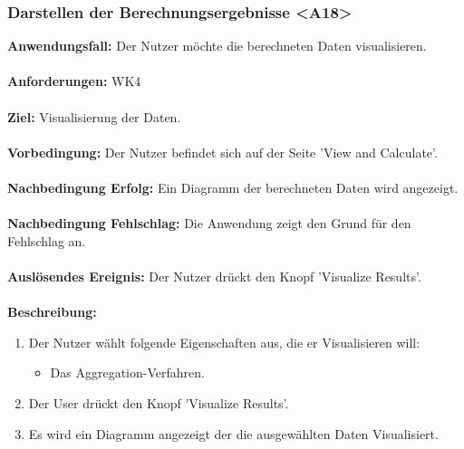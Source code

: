 \documentclass[parskip=full]{scrartcl} %
\begin{document}
\subsubsection*{Darstellen der Berechnungsergebnisse <A18>}
\textbf{Anwendungsfall:} Der Nutzer möchte die berechneten Daten visualisieren.\\\\
\textbf{Anforderungen:} WK4\\\\
\textbf{Ziel:} Visualisierung der Daten.\\\\
\textbf{Vorbedingung:}  Der Nutzer befindet sich auf der Seite 'View and Calculate'.\\\\
\textbf{Nachbedingung Erfolg:} Ein Diagramm der berechneten Daten wird angezeigt.\\\\
\textbf{Nachbedingung Fehlschlag:} Die Anwendung zeigt den Grund für den Fehlschlag an.\\\\
\textbf{Auslösendes Ereignis:} Der Nutzer drückt den Knopf 'Visualize Results'.\\\\
\textbf{Beschreibung:}
\begin{enumerate}
    \item Der Nutzer wählt folgende Eigenschaften aus, die er Visualisieren will:
    \begin{itemize}
        \item Das Aggregation-Verfahren.
    \end{itemize}
    \item Der User drückt den Knopf 'Visualize Results'.
    \item Es wird ein Diagramm angezeigt der die ausgewählten Daten Visualisiert.
\end{enumerate}
\newpage
\end{document}

